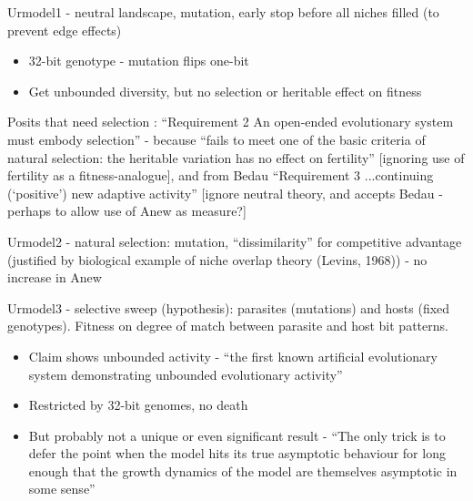 	
	Urmodel1 - neutral landscape, mutation, early stop before all niches
	filled (to prevent edge effects)
	
	\begin{itemize}
		\item
		
		32-bit genotype - mutation flips one-bit
		
		\item
		
		Get unbounded diversity, but no selection or heritable effect on
		fitness
		
	\end{itemize}
	
	Posits that need selection : ``Requirement 2 An open-ended
	evolutionary system must embody selection'' - because ``fails to meet
	one of the basic criteria of natural selection: the heritable
	variation has no effect on fertility'' {[}ignoring use of fertility as
	a fitness-analogue{]}, and from Bedau ``Requirement 3 ...continuing
	(`positive') new adaptive activity'' {[}ignore neutral theory, and
	accepts Bedau - perhaps to allow use of Anew as measure?{]}
	

	Urmodel2 - natural selection: mutation, ``dissimilarity'' for
	competitive advantage (justified by biological example of niche
	overlap theory (Levins, 1968)) - no increase in Anew
	

	Urmodel3 - selective sweep (hypothesis): parasites (mutations) and
	hosts (fixed genotypes). Fitness on degree of match between parasite
	and host bit patterns.
	
	
	\begin{itemize}
		\item
		
		Claim shows unbounded activity - ``the first known artificial
		evolutionary system demonstrating unbounded evolutionary activity''
		
		\item
		
		Restricted by 32-bit genomes, no death
		
		\item
		
		But probably not a unique or even significant result - ``The only
		trick is to defer the point when the model hits its true asymptotic
		behaviour for long enough that the growth dynamics of the model are
		themselves asymptotic in some sense''
		
	\end{itemize}

